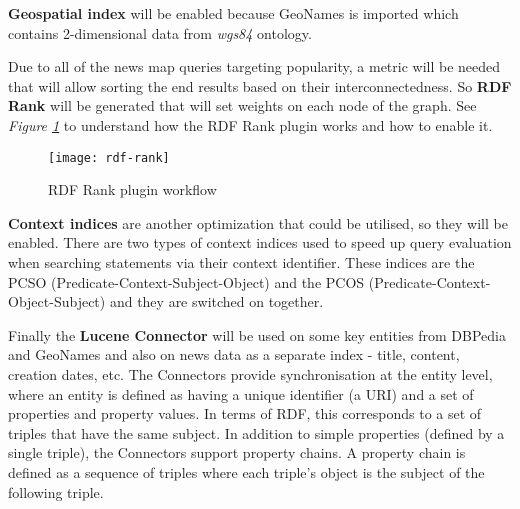\textbf{Geospatial index} will be enabled because GeoNames is imported which contains 2-dimensional data from \textit{wgs84} ontology.

Due to all of the news map queries targeting popularity,  a metric will be needed that will allow sorting the end results based on their interconnectedness. So \textbf{RDF Rank} will be generated that will set weights on each node of the graph. See \textit{Figure \ref{rdf-rank}} to understand how the RDF Rank plugin works and how to enable it.

\begin{figure}[h!]
    \texttt{[image: rdf-rank]}
    \caption{RDF Rank plugin workflow}
    \label{rdf-rank}
\end{figure}

\textbf{Context indices} are another optimization that could be utilised, so they will be enabled. There are two types of context indices used to speed up query evaluation when searching statements via their context identifier. These indices are the PCSO (Predicate-Context-Subject-Object) and the PCOS (Predicate-Context-Object-Subject) and they are switched on together.

Finally the \textbf{Lucene Connector} will be used on some key entities from DBPedia and GeoNames and also on news data as a separate index - title, content, creation dates, etc. The Connectors provide synchronisation at the entity level, where an entity is defined as having a unique identifier (a URI) and a set of properties and property values. In terms of RDF, this corresponds to a set of triples that have the same subject. In addition to simple properties (defined by a single triple), the Connectors support property chains. A property chain is defined as a sequence of triples where each triple’s object is the subject of the following triple.
